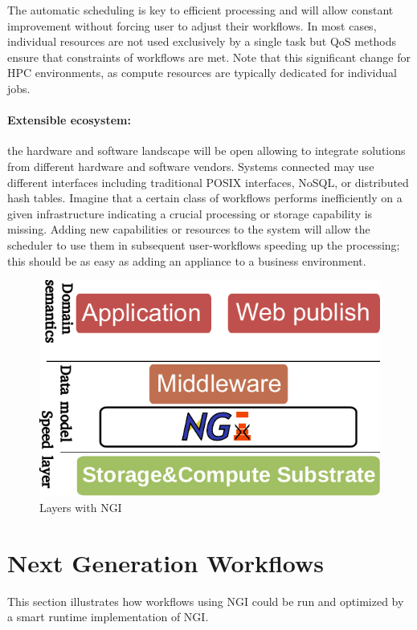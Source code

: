 \documentclass[a4paper, twocolumn]{article}
\begin{document}
The automatic scheduling is key to efficient processing and will allow constant improvement without forcing user to adjust their workflows.
In most cases, individual resources are not used exclusively by a single task but QoS methods ensure that constraints of workflows are met.
Note that this significant change for HPC environments, as compute resources are typically dedicated for individual jobs.

\paragraph{Extensible ecosystem:}
the hardware and software landscape will be open allowing to integrate solutions from different hardware and software vendors.
Systems connected may use different interfaces including traditional POSIX interfaces, NoSQL, or distributed hash tables.
Imagine that a certain class of workflows performs inefficiently on a given infrastructure indicating a crucial processing or storage capability is missing.
Adding new capabilities or resources to the system will allow the scheduler to use them in subsequent user-workflows speeding up the processing; this should be as easy as adding an appliance to a business environment.



\begin{figure}[b]
  \centering
  \includegraphics[width=0.75\columnwidth]{layers-ngi}
  \caption{Layers with NGI}
  \label{fig:ngilayers}
\end{figure}


\section{Next Generation Workflows}
\label{sec:ngWorkflows}

This section illustrates how workflows using NGI could be run and optimized by a smart runtime implementation of NGI.
\end{document}
